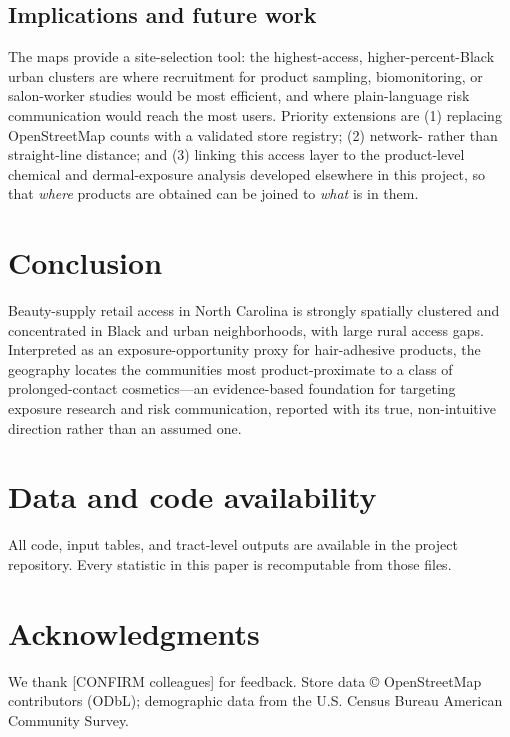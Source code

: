 \documentclass[12pt,letterpaper]{article}
\begin{document}
\subsection{Implications and future work}

The maps provide a site-selection tool: the highest-access, higher-percent-Black
urban clusters are where recruitment for product sampling, biomonitoring, or
salon-worker studies would be most efficient, and where plain-language risk
communication would reach the most users. Priority extensions are (1) replacing
OpenStreetMap counts with a validated store registry; (2) network- rather than
straight-line distance; and (3) linking this access layer to the product-level
chemical and dermal-exposure analysis developed elsewhere in this project, so
that \emph{where} products are obtained can be joined to \emph{what} is in them.

\section{Conclusion}
\label{sec:conclusion}

Beauty-supply retail access in North Carolina is strongly spatially clustered and
concentrated in Black and urban neighborhoods, with large rural access gaps.
Interpreted as an exposure-opportunity proxy for hair-adhesive products, the
geography locates the communities most product-proximate to a class of
prolonged-contact cosmetics---an evidence-based foundation for targeting exposure
research and risk communication, reported with its true, non-intuitive direction
rather than an assumed one.

\section*{Data and code availability}
All code, input tables, and tract-level outputs are available in the project
repository. Every statistic in this paper is recomputable from those files.

\section*{Acknowledgments}
We thank [CONFIRM colleagues] for feedback. Store data \copyright{}
OpenStreetMap contributors (ODbL); demographic data from the U.S. Census Bureau
American Community Survey.
\end{document}
